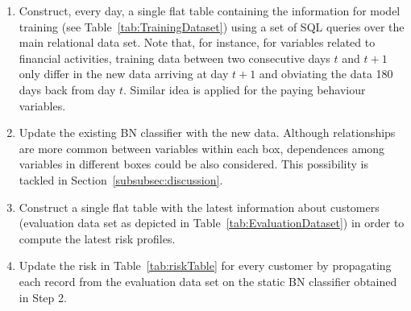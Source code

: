 \begin{enumerate}
\item Construct, every day, a single flat table containing the information for model training (see Table~\ref{tab:TrainingDataset}) using a set of SQL queries over the main relational data set. Note that, for instance, for variables related to financial activities, training data between two consecutive days $t$ and $t+1$ only differ in the new data arriving at day $t+1$ and obviating the data 180 days back from day $t$. Similar idea is applied for the paying behaviour variables.
\item Update the existing BN classifier with the new data. Although relationships are more common between variables within each box, dependences among variables in different boxes could be also considered. This possibility is tackled in Section~\ref{subsubsec:discussion}.
\item Construct a single flat table with the latest information about customers (evaluation data set as depicted in Table~\ref{tab:EvaluationDataset}) in order to compute the latest risk profiles. 
\item Update the risk in Table~\ref{tab:riskTable} for every customer by propagating each record from the evaluation data set on the static BN classifier obtained in Step 2. 
\end{enumerate}





